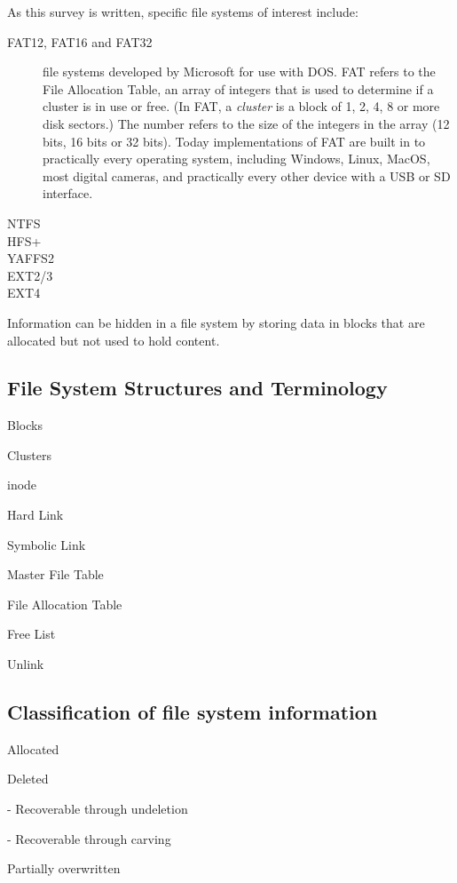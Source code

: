 \documentclass[11pt,letter]{article}
\begin{document}
As this survey is written, specific file systems of interest include:
\begin{description}
\item[FAT12, FAT16 and FAT32] file systems developed by Microsoft for use with
  DOS. FAT refers to the File Allocation Table, an array of integers
  that is used to determine if a cluster is in use or free. (In FAT, a
  \emph{cluster} is a block of 1, 2, 4, 8 or more disk sectors.) The number
  refers to the size of the integers in the array (12 bits, 16 bits or
  32 bits). Today implementations of FAT are built in to practically every
  operating system, including Windows, Linux, MacOS, most digital
  cameras, and practically every other device with a USB or SD
  interface. 
\item[NTFS] 
\item[HFS+]
\item[YAFFS2]
\item[EXT2/3]
\item[EXT4]
\end{description}

Information can be hidden in a file system by storing data in blocks
that are allocated but not used to hold content\cite{dfrws2005:KnutEcksteinAndMarkoJahnke}. 

\subsection{File System Structures and Terminology}

Blocks

Clusters

inode

Hard Link

Symbolic Link

Master File Table

File Allocation Table

Free List

Unlink

\subsection{Classification of file system information}

Allocated

Deleted

 - Recoverable through undeletion

 - Recoverable through carving

Partially overwritten
\end{document}
